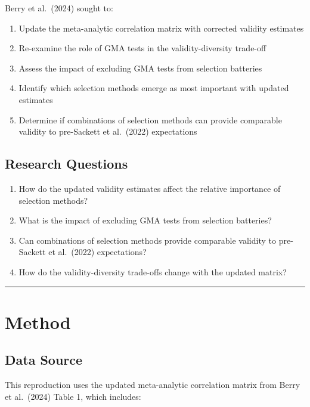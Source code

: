 \documentclass[
]{article}
\providecommand{\tightlist}{%
  \setlength{\itemsep}{0pt}\setlength{\parskip}{0pt}}
\begin{document}
Berry et al.~(2024) sought to:

\begin{enumerate}
\def\labelenumi{\arabic{enumi}.}
\tightlist
\item
  Update the meta-analytic correlation matrix with corrected validity
  estimates
\item
  Re-examine the role of GMA tests in the validity-diversity trade-off
\item
  Assess the impact of excluding GMA tests from selection batteries
\item
  Identify which selection methods emerge as most important with updated
  estimates
\item
  Determine if combinations of selection methods can provide comparable
  validity to pre-Sackett et al.~(2022) expectations
\end{enumerate}

\subsection{Research Questions}\label{research-questions}

\begin{enumerate}
\def\labelenumi{\arabic{enumi}.}
\tightlist
\item
  How do the updated validity estimates affect the relative importance
  of selection methods?
\item
  What is the impact of excluding GMA tests from selection batteries?
\item
  Can combinations of selection methods provide comparable validity to
  pre-Sackett et al.~(2022) expectations?
\item
  How do the validity-diversity trade-offs change with the updated
  matrix?
\end{enumerate}

\begin{center}\rule{0.5\linewidth}{0.5pt}\end{center}

\section{Method}\label{method}

\subsection{Data Source}\label{data-source}

This reproduction uses the updated meta-analytic correlation matrix from
Berry et al.~(2024) Table 1, which includes:
\end{document}
